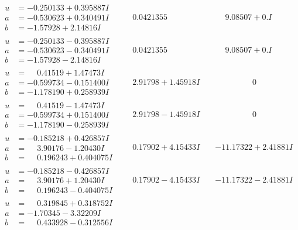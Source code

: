 \documentclass[1p]{elsarticle_modified}
\theoremstyle{definition}
\begin{document}
$$\begin{array}{c|c|c}
\begin{aligned}
u &= -0.250133 + 0.395887 I \\
a &= -0.530623 + 0.340491 I \\
b &= -1.57928 + 2.14816 I\end{aligned}
 & \phantom{-}0.0421355\phantom{ +0.000000I} & \phantom{-}9.08507 + 0. I\phantom{ +0.000000I} \\ \hline\begin{aligned}
u &= -0.250133 - 0.395887 I \\
a &= -0.530623 - 0.340491 I \\
b &= -1.57928 - 2.14816 I\end{aligned}
 & \phantom{-}0.0421355\phantom{ +0.000000I} & \phantom{-}9.08507 + 0. I\phantom{ +0.000000I} \\ \hline\begin{aligned}
u &= \phantom{-}0.41519 + 1.47473 I \\
a &= -0.599734 - 0.151400 I \\
b &= -1.178190 + 0.258939 I\end{aligned}
 & \phantom{-}2.91798 + 1.45918 I & \phantom{-0.000000 } 0 \\ \hline\begin{aligned}
u &= \phantom{-}0.41519 - 1.47473 I \\
a &= -0.599734 + 0.151400 I \\
b &= -1.178190 - 0.258939 I\end{aligned}
 & \phantom{-}2.91798 - 1.45918 I & \phantom{-0.000000 } 0 \\ \hline\begin{aligned}
u &= -0.185218 + 0.426857 I \\
a &= \phantom{-}3.90176 - 1.20430 I \\
b &= \phantom{-}0.196243 + 0.404075 I\end{aligned}
 & \phantom{-}0.17902 + 4.15433 I & -11.17322 + 2.41881 I \\ \hline\begin{aligned}
u &= -0.185218 - 0.426857 I \\
a &= \phantom{-}3.90176 + 1.20430 I \\
b &= \phantom{-}0.196243 - 0.404075 I\end{aligned}
 & \phantom{-}0.17902 - 4.15433 I & -11.17322 - 2.41881 I \\ \hline\begin{aligned}
u &= \phantom{-}0.319845 + 0.318752 I \\
a &= -1.70345 - 3.32209 I \\
b &= \phantom{-}0.433928 - 0.312556 I\end{aligned}

\end{array}$$
\end{document}
